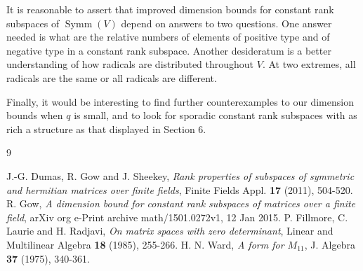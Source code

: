 \documentclass{amsart}
\DeclareMathOperator{\Symm}{Symm}
\theoremstyle{plain}
\theoremstyle{definition}
\begin{document}
It is reasonable to assert that improved dimension bounds for constant rank subspaces of $\Symm(V)$ depend on answers to two questions.
One answer needed is what are the relative numbers of elements of positive type and of negative type in a constant rank subspace.
Another desideratum is a better understanding of how radicals are distributed throughout $V$. At two extremes, all radicals are the same or all
radicals are different.

Finally, it would be interesting to find further counterexamples to our dimension bounds when $q$ is small, and to look for sporadic constant rank subspaces with as rich a structure as that displayed in Section 6.





\begin{thebibliography}{9}


 J.-G. Dumas, R. Gow and J. Sheekey, \emph{Rank properties of subspaces of symmetric and hermitian matrices
over finite fields}, Finite Fields Appl. {\bf 17} (2011), 504-520.
\smallskip
{} R. Gow, \emph{A dimension bound for constant rank subspaces of matrices over a finite field}, arXiv org e-Print archive math/1501.0272v1, 12 Jan 2015.
\smallskip
{} P. Fillmore, C. Laurie and H. Radjavi, \emph{On matrix spaces with zero determinant}, Linear and Multilinear
Algebra {\bf 18} (1985), 255-266.
\smallskip
{} H. N. Ward, \emph{A form for $M_{11}$}, J. Algebra {\bf 37} (1975), 340-361.


\end{thebibliography}
\end{document}
